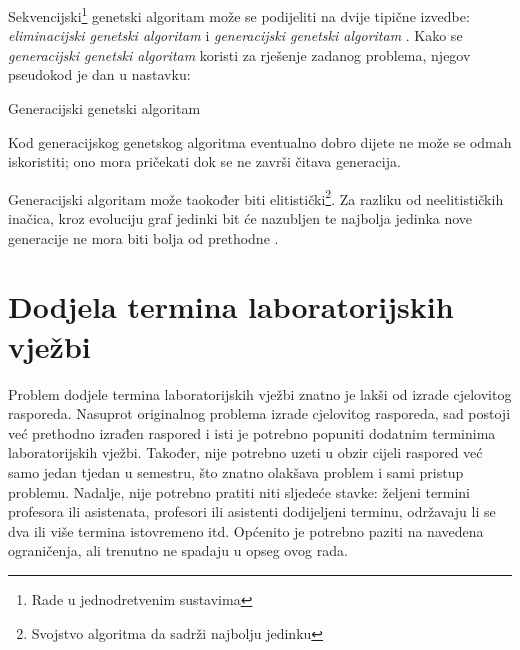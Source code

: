 \documentclass[times, utf8, zavrsni]{fer}
\begin{document}
Sekvencijski\footnote{Rade u jednodretvenim sustavima} genetski algoritam može se podijeliti na dvije tipične izvedbe: \emph{eliminacijski genetski algoritam}  i \emph{generacijski genetski algoritam}  \citep{cupic-disertacija}. Kako se \emph{generacijski genetski algoritam} koristi za rješenje zadanog problema, njegov pseudokod je dan u nastavku:

\begin{algorithm}
\caption{Generacijski genetski algoritam}
\label{algo:generational-algo}
\begin{algorithmic}
\ENDFOR
{}
\ENDFOR
{}
\end{algorithmic}
\end{algorithm}

\newpage

\begin{algorithm}
\begin{algorithmic}
\ENDWHILE
\end{algorithmic}
\end{algorithm}

Kod generacijskog genetskog algoritma eventualno dobro dijete ne može se odmah iskoristiti; ono mora pričekati dok se ne završi čitava generacija.

Generacijski algoritam može taokođer biti elitistički\footnote{Svojstvo algoritma da sadrži najbolju jedinku}. Za razliku od neelitističkih inačica, kroz evoluciju graf jedinki bit će nazubljen te najbolja jedinka nove generacije ne mora biti bolja od prethodne \citep{cupic-skripta}.

\chapter{Dodjela termina laboratorijskih vježbi}
\label{ch:glavni}

Problem dodjele termina laboratorijskih vježbi znatno je lakši od izrade cjelovitog rasporeda. Nasuprot originalnog problema izrade cjelovitog rasporeda, sad postoji već prethodno izrađen raspored i isti je potrebno popuniti dodatnim terminima laboratorijskih vježbi. Također, nije potrebno uzeti u obzir cijeli raspored već samo jedan tjedan u semestru, što znatno olakšava problem i sami pristup problemu. Nadalje, nije potrebno pratiti niti sljedeće stavke: željeni termini profesora ili asistenata, profesori ili asistenti dodijeljeni terminu, održavaju li se dva ili više termina istovremeno itd. Općenito je potrebno paziti na navedena ograničenja, ali trenutno ne spadaju u opseg ovog rada.
\end{document}
